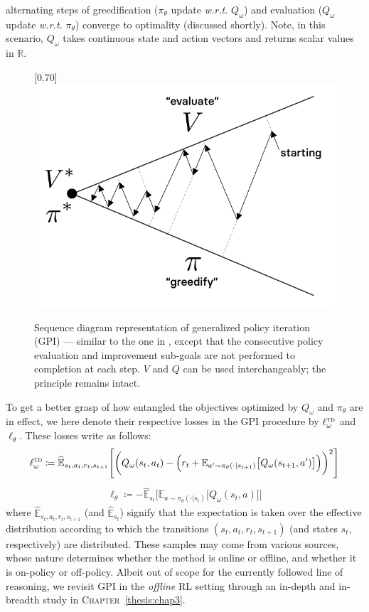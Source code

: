 alternating steps of greedification ($\pi_\theta$ update \textit{w.r.t.} $Q_\omega$)
and evaluation ($Q_\omega$ update \textit{w.r.t.} $\pi_\theta$) converge to optimality
(discussed shortly).
Note, in this scenario, $Q_\omega$ takes
continuous state and action vectors and returns scalar values in $\mathbb{R}$.
\begin{figure}
\center
\scalebox{0.70}[0.70]{\includegraphics{Diags/gpi}}
\caption{Sequence diagram representation of generalized policy iteration (GPI)
--- similar to the one in \cite{Sutton1998-ow}, except that
the consecutive policy evaluation and improvement sub-goals are not performed to completion at each step.
$V$ and $Q$ can be used interchangeably; the principle remains intact.}
\label{fig:gpi}
\end{figure}

To get a better grasp of how entangled the objectives optimized by $Q_\omega$ and $\pi_\theta$
are in effect, we here denote their respective losses in the GPI procedure by $\ell_\omega^\textsc{td}$
and $\ell_\theta$.
These losses write as follows:
\begin{align}
\ell_\omega^\textsc{td}
\coloneqq
\widehat{\mathbb{E}}_{s_t,a_t,r_t,s_{t+1}}
\Bigg[
\bigg(
Q_\omega(s_t,a_t) -
\Big(r_t + \mathbb{E}_{a' \sim \pi_\theta(\cdot|s_{t+1})}
\big[
Q_\omega(s_{t+1},a')
\big]
\Big)
\bigg)^2
\Bigg]
\label{intro:gpiomegatd}
\end{align}
\begin{align}
\ell_\theta
\coloneqq
- \widehat{\mathbb{E}}_{s_t}
\Big[
\mathbb{E}_{a \sim \pi_\theta(\cdot|s_t)}
\big[
Q_\omega(s_t,a)
\big]
\Big]
\label{intro:gpitheta}
\end{align}
where $\widehat{\mathbb{E}}_{s_t,a_t,r_t,s_{t+1}}$ (and $\widehat{\mathbb{E}}_{s_t}$)
signify that the expectation is taken over
the effective distribution according to which the transitions $(s_t,a_t,r_t,s_{t+1})$ (and states $s_t$,
respectively) are distributed. These samples may come from various sources, whose nature determines
whether the method is online or offline, and whether it is on-policy or off-policy.
Albeit out of scope for the currently followed line of reasoning, we revisit GPI in the \emph{offline} RL
setting through an in-depth and in-breadth study in \textsc{Chapter}~\ref{thesis:chap3}.

